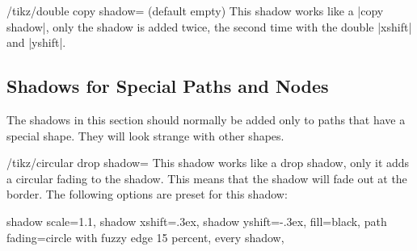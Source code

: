 \begin{key}{/tikz/double copy shadow= (default \normalfont empty)}
    This shadow works like a |copy shadow|, only the shadow is added twice, the
    second time with the double |xshift| and |yshift|.
\begin{codeexample}[preamble={\usetikzlibrary{shapes.symbols}}]
\end{codeexample}
\end{key}


\subsection{Shadows for Special Paths and Nodes}

The shadows in this section should normally be added only to paths that have a
special shape. They will look strange with other shapes.

\begin{key}{/tikz/circular drop shadow=}
    This shadow works like a drop shadow, only it adds a circular fading to the
    shadow. This means that the shadow will fade out at the border. The
    following options are preset for this shadow:
\begin{codeexample}
  shadow scale=1.1, shadow xshift=.3ex, shadow yshift=-.3ex,
  fill=black, path fading={circle with fuzzy edge 15 percent},
  every shadow,
\end{codeexample}

\begin{codeexample}[]
\end{codeexample}
\end{key}

